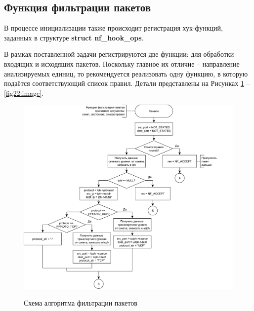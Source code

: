 \pagebreak

\subsection{Функция фильтрации пакетов}
В процессе инициализации также происходит регистрация хук-функций, заданных в структуре \textbf{struct nf\_hook\_ops}. 

В рамках поставленной задачи регистрируются две функции: для обработки входящих и исходящих пакетов. Поскольку главное их отличие -- направление анализируемых единиц, то рекомендуется реализовать одну функцию, в которую подаётся соответствующий список правил. Детали представлены на Рисунках \ref{fig9:image} -- \ref{fig22:image}.

\begin{figure}[h!]
	\begin{center}
		{\includegraphics[scale = 0.55]{img/filter1.pdf}}
		\caption{Схема алгоритма фильтрации пакетов}
		\label{fig9:image}
	\end{center}
\end{figure}


